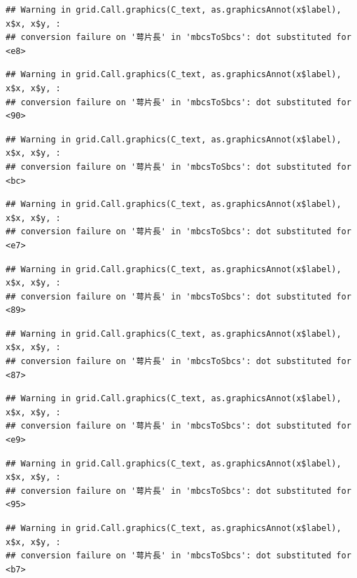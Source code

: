 \documentclass[
]{book}
\begin{document}
\begin{verbatim}
## Warning in grid.Call.graphics(C_text, as.graphicsAnnot(x$label), x$x, x$y, :
## conversion failure on '萼片長' in 'mbcsToSbcs': dot substituted for <e8>
\end{verbatim}

\begin{verbatim}
## Warning in grid.Call.graphics(C_text, as.graphicsAnnot(x$label), x$x, x$y, :
## conversion failure on '萼片長' in 'mbcsToSbcs': dot substituted for <90>
\end{verbatim}

\begin{verbatim}
## Warning in grid.Call.graphics(C_text, as.graphicsAnnot(x$label), x$x, x$y, :
## conversion failure on '萼片長' in 'mbcsToSbcs': dot substituted for <bc>
\end{verbatim}

\begin{verbatim}
## Warning in grid.Call.graphics(C_text, as.graphicsAnnot(x$label), x$x, x$y, :
## conversion failure on '萼片長' in 'mbcsToSbcs': dot substituted for <e7>
\end{verbatim}

\begin{verbatim}
## Warning in grid.Call.graphics(C_text, as.graphicsAnnot(x$label), x$x, x$y, :
## conversion failure on '萼片長' in 'mbcsToSbcs': dot substituted for <89>
\end{verbatim}

\begin{verbatim}
## Warning in grid.Call.graphics(C_text, as.graphicsAnnot(x$label), x$x, x$y, :
## conversion failure on '萼片長' in 'mbcsToSbcs': dot substituted for <87>
\end{verbatim}

\begin{verbatim}
## Warning in grid.Call.graphics(C_text, as.graphicsAnnot(x$label), x$x, x$y, :
## conversion failure on '萼片長' in 'mbcsToSbcs': dot substituted for <e9>
\end{verbatim}

\begin{verbatim}
## Warning in grid.Call.graphics(C_text, as.graphicsAnnot(x$label), x$x, x$y, :
## conversion failure on '萼片長' in 'mbcsToSbcs': dot substituted for <95>
\end{verbatim}

\begin{verbatim}
## Warning in grid.Call.graphics(C_text, as.graphicsAnnot(x$label), x$x, x$y, :
## conversion failure on '萼片長' in 'mbcsToSbcs': dot substituted for <b7>
\end{verbatim}
\end{document}
